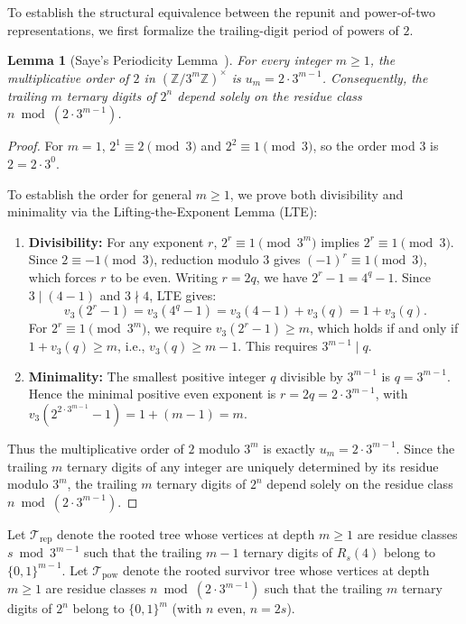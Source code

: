 \documentclass[11pt,reqno]{amsart}
\theoremstyle{plain}
\newtheorem{lemma}[theorem]{Lemma}
\theoremstyle{definition}
\theoremstyle{remark}
\newcommand{\Z}{\mathbb{Z}}
\newcommand{\Trep}{\mathcal{T}_{\mathrm{rep}}}
\newcommand{\Tpow}{\mathcal{T}_{\mathrm{pow}}}
\begin{document}
To establish the structural equivalence between the repunit and power-of-two representations, we first formalize the trailing-digit period of powers of $2$.

\begin{lemma}[Saye's Periodicity Lemma~\cite{Saye2022}]\label{lem:saye_period}
For every integer $m \ge 1$, the multiplicative order of $2$ in $(\Z / 3^m \Z)^\times$ is $u_m = 2 \cdot 3^{m-1}$. Consequently, the trailing $m$ ternary digits of $2^n$ depend solely on the residue class $n \bmod (2 \cdot 3^{m-1})$.
\end{lemma}

\begin{proof}
For $m = 1$, $2^1 \equiv 2 \pmod 3$ and $2^2 \equiv 1 \pmod 3$, so the order mod $3$ is $2 = 2 \cdot 3^0$. 

To establish the order for general $m \ge 1$, we prove both divisibility and minimality via the Lifting-the-Exponent Lemma (LTE):
\begin{enumerate}
    \item \textbf{Divisibility:} For any exponent $r$, $2^r \equiv 1 \pmod{3^m}$ implies $2^r \equiv 1 \pmod 3$. Since $2 \equiv -1 \pmod 3$, reduction modulo $3$ gives $(-1)^r \equiv 1 \pmod 3$, which forces $r$ to be even. Writing $r = 2q$, we have $2^r - 1 = 4^q - 1$. Since $3 \mid (4 - 1)$ and $3 \nmid 4$, LTE gives:
    \begin{equation}
    v_3(2^r - 1) = v_3(4^q - 1) = v_3(4 - 1) + v_3(q) = 1 + v_3(q).
    \end{equation}
    For $2^r \equiv 1 \pmod{3^m}$, we require $v_3(2^r - 1) \ge m$, which holds if and only if $1 + v_3(q) \ge m$, i.e., $v_3(q) \ge m - 1$. This requires $3^{m-1} \mid q$.
    \item \textbf{Minimality:} The smallest positive integer $q$ divisible by $3^{m-1}$ is $q = 3^{m-1}$. Hence the minimal positive even exponent is $r = 2q = 2 \cdot 3^{m-1}$, with $v_3(2^{2 \cdot 3^{m-1}} - 1) = 1 + (m - 1) = m$.
\end{enumerate}
Thus the multiplicative order of $2$ modulo $3^m$ is exactly $u_m = 2 \cdot 3^{m-1}$. Since the trailing $m$ ternary digits of any integer are uniquely determined by its residue modulo $3^m$, the trailing $m$ ternary digits of $2^n$ depend solely on the residue class $n \bmod (2 \cdot 3^{m-1})$.
\end{proof}

Let $\Trep$ denote the rooted tree whose vertices at depth $m \ge 1$ are residue classes $s \bmod 3^{m-1}$ such that the trailing $m-1$ ternary digits of $R_s(4)$ belong to $\{0, 1\}^{m-1}$. Let $\Tpow$ denote the rooted survivor tree whose vertices at depth $m \ge 1$ are residue classes $n \bmod (2 \cdot 3^{m-1})$ such that the trailing $m$ ternary digits of $2^n$ belong to $\{0, 1\}^m$ (with $n$ even, $n = 2s$).
\end{document}
